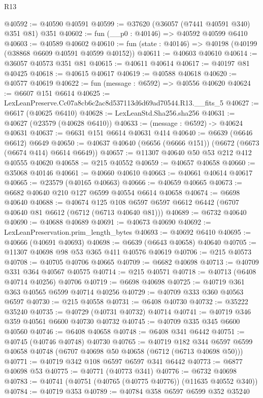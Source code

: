 \begin{lexlean}{R13}
\begin{coremodule}
@40592 := @40590 @40591
@40599 := @37620 (@36057 (@7441 @40591 @340) @351 @81) @351
@40602 := fun (__p0 : @40146) => @40592 @40599 @6410
@40603 := @40589 @40602
@40610 := fun (state : @40146) => @40198 (@40199 (@38868 @6609 @40591 @40599 @40152))
@40611 := @40603 @40610
@40614 := @36057 @40573 @351 @81
@40615 := @40611 @40614
@40617 := @40197 @81 @40425
@40618 := @40615 @40617
@40619 := @40588 @40618
@40620 := @40577 @40619
@40622 := fun (message : @6592) => @40556 @40620
@40624 := @6607 @151 @6614
@40625 := LexLeanPreserve.Cc07a8cb6c2ac8d537113d6d69ad70544.R13.__fits_5
@40627 := @6617 (@40625 @6410)
@40628 := LexLeanStd.Sha256.sha256
@40631 := @40627 (@23579 (@40628 @6410))
@40633 := (message : @6592) -> @40624 @40631
@40637 := @6631 @151 @6614 @40631 @414
@40640 := @6639 (@6646 @6612) @6649
@40650 := @40637 @40640 (@6656 (@6666 @151)) (@6672 (@6673 (@6674 @414) @6614 @6649))
@40657 := @11307 @40640 @50 @53 @212 @412 @40555 @40620
@40658 := @215 @40552
@40659 := @40657 @40658
@40660 := @35068 @40146
@40661 := @40660 @40610
@40663 := @40661 @40614 @40617
@40665 := @23579 (@40165 @40663)
@40666 := @40659 @40665
@40673 := @6682 @40640 @210 @127 @6599 @40554 @6614 @40658
@40674 := @6698 @40640
@40688 := @40674
    @125
    @108
    @6597
    @6597
    @6612
    @6442
    (@6707 @40640 @81 @6612 (@6712 (@6713 @40640 @81)))
@40689 := @6732 @40640
@40690 := @40688 @40689
@40691 := @40673 @40690
@40692 := LexLeanPreservation.prim_length_bytes
@40693 := @40692 @6410
@40695 := @40666 (@40691 @40693)
@40698 := @6639 (@6643 @40658) @40640
@40705 := @11307 @40698 @98 @53 @365 @411 @40576 @40619
@40706 := @215 @40573
@40708 := @40705 @40706 @40665
@40709 := @6682 @40698
@40713 := @40709 @331 @364 @40567 @40575
@40714 := @215 @40571
@40718 := @40713 (@6408 @40714 @40256) @40706
@40719 := @6698 @40698
@40725 := @40719 @361 @363 @40565 @6599 @40714 @40256
@40729 := @40709 @333 @360 @40563 @6597
@40730 := @215 @40558
@40731 := @6408 @40730
@40732 := @35222 @35240
@40735 := @40729 (@40731 @40732) @40714
@40741 := @40719 @346 @359 @40561 @6600 @40730 @40732
@40745 := @40709 @335 @345 @6600 @40560
@40746 := @6408 @40658
@40748 := @6408 @341 @6442
@40751 := @40745 (@40746 @40748) @40730
@40765 := @40719
    @182
    @344
    @6597
    @6599
    @40658
    @40748
    (@6707 @40698 @50 @40658 (@6712 (@6713 @40698 @50)))
@40771 := @40719 @342 @108 @6597 @6597 @341 @6442
@40773 := @6877 @40698 @53
@40775 := @40771 (@40773 @341)
@40776 := @6732 @40698
@40783 := @40741 (@40751 (@40765 (@40775 @40776)) (@11635 @40552 @340))
@40784 := @40719 @353
@40789 := @40784 @358 @6597 @6599 @352 @35240

\end{coremodule}
\end{lexlean}
